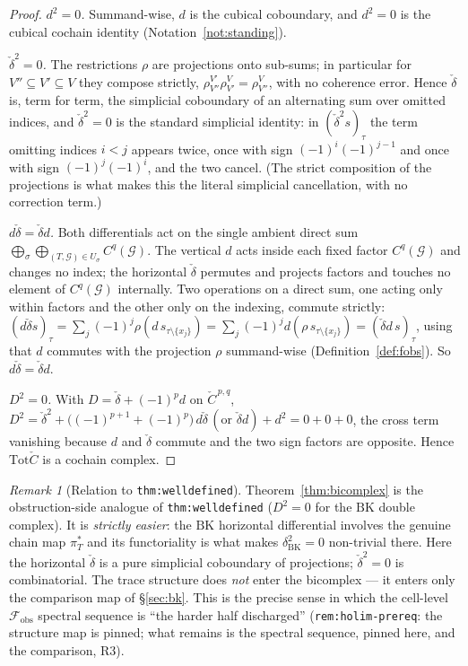 \documentclass[11pt,oneside]{amsart}
\theoremstyle{plain}
\theoremstyle{definition}
\theoremstyle{remark}
\newtheorem{remark}[theorem]{Remark}
\theoremstyle{honeststyle}
\newcommand{\G}{\mathcal{G}}
\newcommand{\BK}{\mathrm{BK}}
\newcommand{\Tot}{\mathrm{Tot}}
\newcommand{\fobs}{\mathcal{F}_{\mathrm{obs}}}
\newcommand{\Ccheck}{\check{C}}
\begin{document}
\begin{proof}
\emph{$d^{2}=0$.} Summand-wise, $d$ is the cubical coboundary, and
$d^{2}=0$ is the cubical cochain identity (Notation~\ref{not:standing}).

\emph{$\check\delta^{2}=0$.} The restrictions $\rho$ are projections
onto sub-sums; in particular for $V''\subseteq V'\subseteq V$ they
compose strictly, $\rho^{V'}_{V''}\rho^{V}_{V'}=\rho^{V}_{V''}$, with
no coherence error. Hence $\check\delta$ is, term for term, the
simplicial coboundary of an alternating sum over omitted indices, and
$\check\delta^{2}=0$ is the standard simplicial identity: in
$(\check\delta^{2}s)_{\tau}$ the term omitting indices $i<j$ appears
twice, once with sign $(-1)^{i}(-1)^{j-1}$ and once with sign
$(-1)^{j}(-1)^{i}$, and the two cancel. (The strict composition of the
projections is what makes this the literal simplicial cancellation,
with no correction term.)

\emph{$d\check\delta=\check\delta d$.} Both differentials act on the
single ambient direct sum $\bigoplus_{\sigma}\bigoplus_{(T,\G)\in
U_{\sigma}}C^{q}(\G)$. The vertical $d$ acts inside each fixed factor
$C^{q}(\G)$ and changes no index; the horizontal $\check\delta$
permutes and projects factors and touches no element of $C^{q}(\G)$
internally. Two operations on a direct sum, one acting only within
factors and the other only on the indexing, commute strictly:
$(d\check\delta s)_{\tau}=\sum_{j}(-1)^{j}\rho(d\,s_{\tau\setminus
\{x_{j}\}})=\sum_{j}(-1)^{j}d(\rho\,s_{\tau\setminus\{x_{j}\}})
=(\check\delta d\,s)_{\tau}$, using that $d$ commutes with the
projection $\rho$ summand-wise (Definition~\ref{def:fobs}). So
$d\check\delta=\check\delta d$.

\emph{$D^{2}=0$.} With $D=\check\delta+(-1)^{p}d$ on $\Ccheck^{\,p,q}$,
$D^{2}=\check\delta^{2}+\bigl((-1)^{p+1}+(-1)^{p}\bigr)\,d\check\delta
\,(\text{or }\check\delta d)+d^{2}=0+0+0$, the cross term vanishing
because $d$ and $\check\delta$ commute and the two sign factors are
opposite. Hence $\Tot\Ccheck$ is a cochain complex.
\end{proof}

\begin{remark}[Relation to \texttt{thm:welldefined}]
\label{rem:vs-welldefined}
Theorem~\ref{thm:bicomplex} is the obstruction-side analogue of
\texttt{thm:welldefined} ($D^{2}=0$ for the $\BK$ double complex). It
is \emph{strictly easier}: the $\BK$ horizontal differential involves
the genuine chain map $\pi_{T}^{*}$ and its functoriality is what
makes $\delta_{\BK}^{2}=0$ non-trivial there. Here the horizontal
$\check\delta$ is a pure simplicial coboundary of projections;
$\check\delta^{2}=0$ is combinatorial. The trace structure does
\emph{not} enter the bicomplex --- it enters only the comparison map
of \S\ref{sec:bk}. This is the precise sense in which the cell-level
$\fobs$ spectral sequence is ``the harder half discharged''
(\texttt{rem:holim-prereq}: the structure map is pinned; what remains
is the spectral sequence, pinned here, and the comparison, R3).
\end{remark}
\end{document}
